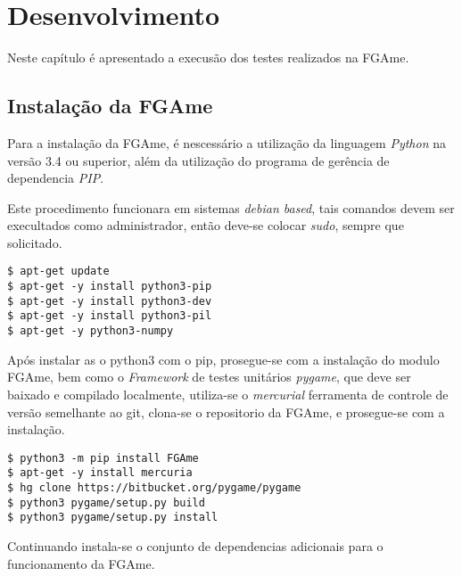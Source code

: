 \pagestyle{empty}

\chapter{Desenvolvimento}

Neste capítulo é apresentado a execusão dos testes realizados na FGAme.

\section{Instalação da FGAme}
Para a instalação da FGAme, é nescessário a utilização da linguagem \textit{Python} na versão 3.4 ou superior, além da utilização do programa de gerência de dependencia \textit{PIP}.

Este procedimento funcionara em sistemas \textit{debian based}, tais comandos devem ser execultados como administrador, então deve-se colocar \textit{sudo}, sempre que solicitado.

\begin{lstlisting}
$ apt-get update
$ apt-get -y install python3-pip
$ apt-get -y install python3-dev
$ apt-get -y install python3-pil
$ apt-get -y python3-numpy 
\end{lstlisting}

Após instalar as o python3 com o pip, prosegue-se com a instalação do modulo FGAme, bem como o \textit{Framework} de testes unitários \textit{pygame}, que deve ser baixado e compilado localmente, utiliza-se o \textit{mercurial} ferramenta de controle de versão semelhante ao git, clona-se o repositorio da FGAme, e prosegue-se com a instalação.

\begin{lstlisting}
$ python3 -m pip install FGAme
$ apt-get -y install mercuria
$ hg clone https://bitbucket.org/pygame/pygame
$ python3 pygame/setup.py build
$ python3 pygame/setup.py install
\end{lstlisting}

Continuando instala-se o conjunto de dependencias adicionais para o funcionamento da FGAme.

